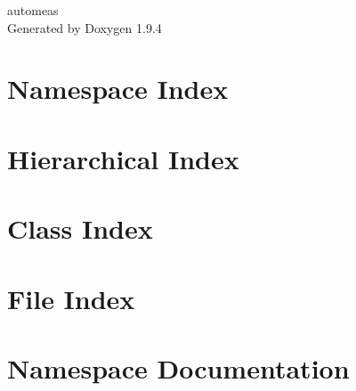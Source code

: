\documentclass[twoside]{book}
\newcommand{\+}{\discretionary{\mbox{\scriptsize$\hookleftarrow$}}{}{}}
\newcommand{\clearemptydoublepage}{%
    \newpage{\pagestyle{empty}\cleardoublepage}%
  }
\begin{document}
  \raggedbottom
    \hypersetup{pageanchor=false,
                bookmarksnumbered=true,
                pdfencoding=unicode
               }
  \begin{titlepage}
  \vspace*{7cm}
  \begin{center}%
  {\Large automeas}\\
  \vspace*{1cm}
  {\large Generated by Doxygen 1.9.4}\\
  \end{center}
  \end{titlepage}
  \clearemptydoublepage
  \tableofcontents
  \clearemptydoublepage
  \hypersetup{pageanchor=true}
\chapter{Namespace Index}

\chapter{Hierarchical Index}

\chapter{Class Index}

\chapter{File Index}

\chapter{Namespace Documentation}
























\end{document}

